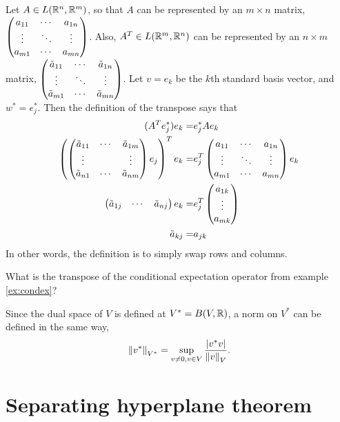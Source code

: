 \begin{example}
  Let $A \in L(\mathbb{R}^n, \mathbb{R}^m)$, so that $A$ can be represented by an $m
  \times n$ matrix, $\begin{pmatrix} {a}_{11} & \cdots & {a}_{1n} \\ \vdots & \ddots & \vdots \\ {a}_{m1} & \cdots & {a}_{mn} \end{pmatrix}$. Also, $A^T \in L(\mathbb{R}^m, \mathbb{R}^n)$ can
  be represented by an $n \times m$ matrix, $\begin{pmatrix} {\tilde{a}}_{11} & \cdots & {\tilde{a}}_{1n} \\ \vdots & \ddots & \vdots \\ {\tilde{a}}_{m1} & \cdots & {\tilde{a}}_{mn} \end{pmatrix}$. Let
  $v = e_k$ be the $k$th standard basis vector, and $w^\ast =
  e_j^\ast$. Then the definition of the transpose says that
  \begin{align*}
    (A^T e_j^\ast) e_k = & e_j^\ast A e_k  \\
    \left(\begin{pmatrix} \tilde{a}_{11} & \cdots & \tilde{a}_{1m} \\
        \vdots & & \vdots \\
        \tilde{a}_{n1} & \cdots & \tilde{a}_{nm}
      \end{pmatrix}
                                  e_j\right)^T e_k = & e_j^T
                                                       \begin{pmatrix} {a}_{11} & \cdots & {a}_{1n} \\ \vdots & \ddots & \vdots \\ {a}_{m1} & \cdots & {a}_{mn} \end{pmatrix} e_k
    \\ 
    \begin{pmatrix} \tilde{a}_{1j} & \cdots &  \tilde{a}_{nj}
    \end{pmatrix} e_k  = & e_j^T \begin{pmatrix} a_{1k} \\ \vdots \\  a_{mk}
    \end{pmatrix} \\
    \tilde{a}_{kj} = & a_{jk}
  \end{align*}
  In other words, the definition is to simply swap rows and columns.  
\end{example}
\begin{exercise} What is the transpose of the conditional
  expectation operator from example \ref{ex:condex}?
\end{exercise}
Since the dual space of $V$ is defined at $V^* = B(V,\mathbb{R})$, a norm on
$V^*$ can be defined in the same way, 
\[ \left\Vert {v^*} \right\Vert_{V^*} = \sup_{v \neq 0, v \in V}
\frac{\left\vert {v^*v} \right\vert}{\left\Vert {v} \right\Vert_V}. \]

\section{Separating hyperplane theorem}

